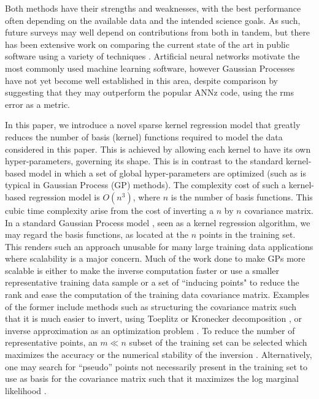 \documentclass[useAMS,usenatbib,fleqn]{mn2e}
\begin{document}
Both methods have their strengths and weaknesses, with the best performance often depending on the available data and the intended science goals. As such, future surveys may well depend on contributions from both in tandem, but there has been extensive work on comparing the current state of the art in public software using a variety of techniques \citep{hildebrandt10,abdalla11,sanchez14}. Artificial neural networks motivate the most commonly used machine learning software, however Gaussian Processes \citep[e.g.][]{Way2009} have not yet become well established in this area, despite comparison by \citet{bonfield10} suggesting that they may outperform the popular ANNz code, using the rms error as a metric. 


In this paper, we introduce a novel sparse kernel regression model that greatly reduces the number of basis (kernel) functions required to model the data considered in this paper. This is achieved by allowing each kernel to have its own hyper-parameters, governing its shape. This is in contrast to the standard kernel-based model in which a set of global hyper-parameters are optimized (such as is typical in Gaussian Process (GP) methods). The complexity cost of such a kernel-based regression model is $O\left(n^{3}\right)$, where $n$ is the number of basis functions. This cubic time complexity arise from the cost of inverting a $n$ by $n$ covariance matrix. In a standard Gaussian Process model \citep{rasmussen2006gaussian}, seen as a kernel regression algorithm, we may regard the basis functions, as located at the $n$ points in the training set. This renders such an approach unusable for many large training data applications where scalability is a major concern. Much of the work done to make GPs more scalable is either to make the inverse computation faster or use a smaller representative training data sample or a set of ``inducing points" to reduce the rank and ease the computation of the training data covariance matrix. Examples of the former include methods such as structuring the covariance matrix such that it is much easier to invert, using Toeplitz  \citep{zhang2005time} or Kronecker decomposition \citep{tsiligkaridis2013}, or inverse approximation as an optimization problem \citep{gibbs97}. To reduce the number of representative points, an $m \ll n$ subset of the training set can be selected which maximizes the accuracy or the numerical stability of the inversion \citep{foster2009}. Alternatively, one may search for ``pseudo'' points not necessarily present in the training set to use as basis for the covariance matrix such that it maximizes the log marginal likelihood \citep{snelson2005}. 
\end{document}
